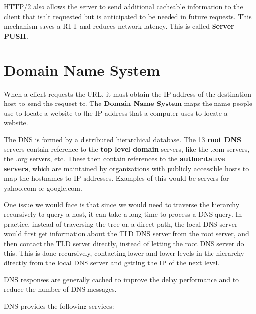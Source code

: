 \documentclass[12pt,letterpaper]{book}
\theoremstyle{definition}
\begin{document}
HTTP/2 also allows the server to send additional cacheable information to the client that isn't requested but is anticipated to be needed in future requests. This mechanism saves a RTT and reduces network latency. This is called \textbf{Server PUSH}.

\section{Domain Name System}

When a client requests the URL, it must obtain the IP address of the destination host to send the request to. The \textbf{Domain Name System} maps the name people use to locate a website to the IP address that a computer uses to locate a website.

The DNS is formed by a distributed hierarchical database. The 13 \textbf{root DNS} servers contain reference to the \textbf{top level domain} servers, like the .com servers, the .org servers, etc. These then contain references to the \textbf{authoritative servers}, which are maintained by organizations with publicly accessible hosts to map the hostnames to IP addresses. Examples of this would be servers for yahoo.com or google.com.

One issue we would face is that since we would need to traverse the hierarchy recursively to query a host, it can take a long time to process a DNS query. In practice, instead of traversing the tree on a direct path, the local DNS server would first get information about the TLD DNS server from the root server, and then contact the TLD server directly, instead of letting the root DNS server do this. This is done recursively, contacting lower and lower levels in the hierarchy directly from the local DNS server and getting the IP of the next level.

DNS responses are generally cached to improve the delay performance and to reduce the number of DNS messages.

DNS provides the following services:
\end{document}
